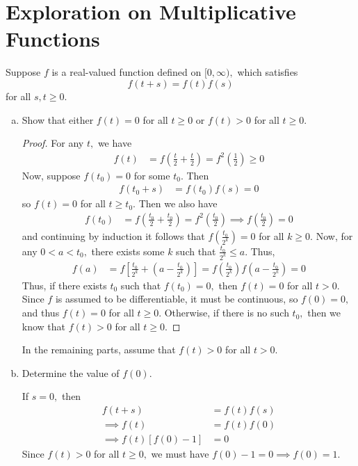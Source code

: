\documentclass{article}
\begin{document}
\section*{Exploration on Multiplicative Functions}

Suppose $f$ is a real-valued function defined on $[0, \infty),$ which satisfies
	\[f(t+s) = f(t) f(s)\]
	for all $s, t\ge 0.$

	\newpage

	\begin{enumerate}[(a)]
		\item Show that either $f(t)=0$ for all $t\ge 0$ or $f(t)>0$ for all $t\ge 0.$

			\begin{proof}
				For any $t,$ we have
				\begin{align*}
					f(t) &= f\left( \frac{t}{2} + \frac{t}{2} \right) = f^2\left( \frac{1}{2} \right) \ge 0
				\end{align*}
				Now, suppose $f(t_0)=0$ for some $t_0.$ Then
				\begin{align*}
					f(t_0+s) &= f(t_0)f(s) = 0
				\end{align*}
				so $f(t)=0$ for all $t\ge t_0.$ Then we also have
				\begin{align*}
					f(t_0) &= f\left( \frac{t_0}{2} + \frac{t_0}{2} \right) = f^2\left( \frac{t_0}{2} \right) \implies f\left( \frac{t_0}{2} \right) = 0
				\end{align*}
				and continuing by induction it follows that $f\left( \frac{t_0}{2^{k}} \right) = 0$ for all $k\ge 0.$ Now, for any $0<a<t_0,$ there exists some $k$ such that $\frac{t_0}{2^k} \le a.$ Thus, 
				\begin{align*}
					f(a) &= f\left[ \frac{t_0}{2^k} + \left( a-\frac{t_0}{2^k} \right)\right] =  f\left( \frac{t_0}{2^k} \right) f\left( a-\frac{t_0}{2^k} \right) = 0
				\end{align*}
				Thus, if there exists $t_0$ such that $f(t_0)=0,$ then $f(t)=0$ for all $t>0.$ Since $f$ is assumed to be differentiable, it must be continuous, so $f(0)=0,$ and thus $f(t)=0$ for all $t\ge 0.$ Otherwise, if there is no such $t_0,$ then we know that $f(t)>0$ for all $t\ge0.$ 
			\end{proof}

			In the remaining parts, assume that $f(t)>0$ for all $t>0.$

		\item Determine the value of $f(0).$
			\begin{soln}
				If $s=0,$ then
				\begin{align*}
					f(t+s) &= f(t)f(s) \\
					\implies f(t) &= f(t)f(0) \\
					\implies f(t)\left[ f(0)-1 \right] &= 0
				\end{align*}
				Since $f(t)>0$ for all $t\ge 0,$ we must have $f(0)-1=0\implies f(0)=\boxed1.$
			\end{soln}


\end{enumerate}
\end{document}
